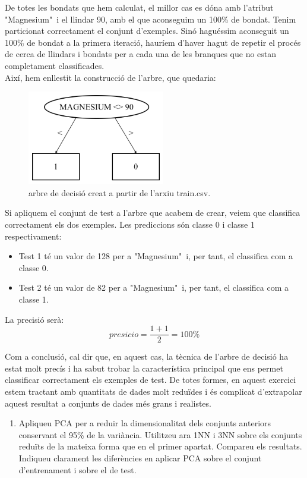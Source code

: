 \documentclass{article} %
\begin{document}
{	De totes les bondats que hem calculat, el millor cas es dóna amb l’atribut "Magnesium"\ i el llindar 90, amb el que aconseguim un 100\% de bondat. Tenim particionat correctament el conjunt d’exemples. Sinó haguéssim aconseguit un 100\% de bondat a la primera iteració, hauríem d'haver hagut de repetir el procés de cerca de llindars i bondats per a cada una de les branques que no estan completament classificades. \\

	Així, hem enllestit la construcció de l'arbre, que quedaria:

	\begin{figure}[H]
		\includegraphics[width=6cm]{magnesiumtree}
		\centering
		\color{blue}
		\caption{arbre de decisió creat a partir de l'arxiu train.csv.}\label{visina8}
	\end{figure}

	Si apliquem el conjunt de test a l'arbre que acabem de crear, veiem que classifica correctament els dos exemples. Les prediccions són classe 0 i classe 1 respectivament:

	\begin{itemize}
		\item Test 1 té un valor de 128 per a "Magnesium"\ i, per tant, el classifica com a classe 0.
		\item Test 2 té un valor de 82 per a "Magnesium"\ i, per tant, el classifica com a classe 1.
	\end{itemize}

	La precisió serà:
	\[presicio = \frac{1 + 1}{2} = 100\%\]

	Com a conclusió, cal dir que, en aquest cas, la tècnica de l'arbre de decisió ha estat molt precís i ha sabut trobar la característica principal que ens permet classificar correctament els exemples de test. De totes formes, en aquest exercici estem tractant amb quantitats de dades molt reduïdes i és complicat d'extrapolar aquest resultat a conjunts de dades més grans i realistes. \\
	 
}

\begin{enumerate}[resume, label=\alph*]
	\item Apliqueu PCA per a reduir la dimensionalitat dels conjunts anteriors conservant el 95\% de la variància. Utilitzeu ara 1NN i 3NN sobre els conjunts reduïts de la mateixa forma que en el primer apartat. Compareu els resultats. Indiqueu clarament les diferències en aplicar PCA sobre el conjunt d'entrenament i sobre el de test.
\end{enumerate}
\end{document}
